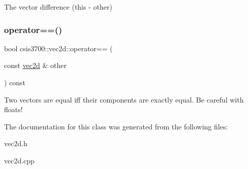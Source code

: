 The vector difference (this -\/ other) \mbox{\label{classcsis3700_1_1vec2d_a03dc593f880647772abb9b0abc865cbe}} 
\subsubsection{\texorpdfstring{operator==()}{operator==()}}
{\footnotesize\ttfamily bool csis3700\+::vec2d\+::operator== (\begin{DoxyParamCaption}\item[{const \hyperlink{classcsis3700_1_1vec2d}{vec2d} \&}]{other }\end{DoxyParamCaption}) const}

Two vectors are equal iff their components are exactly equal. Be careful with floats! 

The documentation for this class was generated from the following files\+:\begin{DoxyCompactItemize}
\item 
vec2d.\+h\item 
vec2d.\+cpp\end{DoxyCompactItemize}
